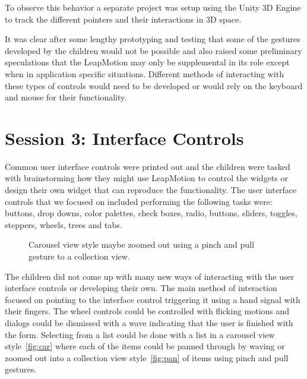 To observe this behavior a separate project was setup using the Unity 3D Engine to track the different pointers and their interactions in 3D space.\cite{unity}

It was clear after some lengthy prototyping and testing that some of the gestures developed by the children would not be possible and also raised some preliminary speculations that the LeapMotion may only be supplemental in its role except when in application specific situations. Different methods of interacting with these types of controls would need to be developed or would rely on the keyboard and mouse for their functionality.


\section{Session 3: Interface Controls}\label{session3}

Common user interface controls were printed out and the children were tasked with brainstorming how they might use LeapMotion to control the widgets or design their own widget that can reproduce the functionality. The user interface controls that we focused on included performing the following tasks were: buttons, drop downs, color palettes, check boxes, radio, buttons, sliders, toggles, steppers, wheels, trees and tabs.


\begin{figure}
\centering     %
{}
\caption{Carousel view style maybe zoomed out using a pinch and pull gesture to a collection view. }
\label{fig:collectionview}
\end{figure}
The children did not come up with many new ways of interacting with the user interface controls or developing their own. The main method of interaction focused on pointing to the interface control triggering it using a hand signal with their fingers. The wheel controls could be controlled with flicking motions and dialogs could be dismissed with a wave indicating that the user is finished with the form. Selecting from a list could be done with a list in a carousel view style~\ref{fig:car} where each of the items could be panned through by waving or zoomed out into a collection view style~\ref{fig:pan} of items using pinch and pull gestures. 

